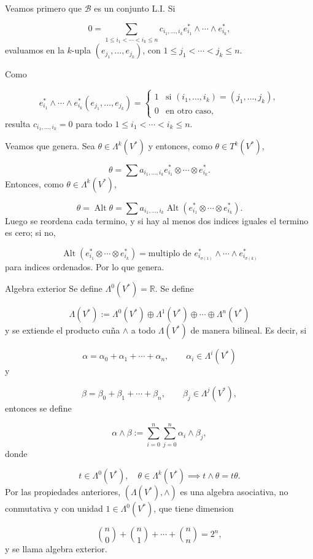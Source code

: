 \begin{bookproof}{}
Veamos primero que $\mathcal B$ es un conjunto L.I. Si

\[
0=\sum_{1\le i_1<\cdots<i_k\le n}c_{i_1,\ldots,i_k}e^*_{i_1}\wedge\cdots\wedge e^*_{i_k},
\]
evaluamos en la $k$-upla $(e_{j_1},\ldots,e_{j_k})$, con $1\le j_1<\cdots<j_k\le n$.

Como

\[
e^*_{i_1}\wedge\cdots\wedge e^*_{i_k}(e_{j_1},\ldots,e_{j_k}) = \begin{cases} 1 & \text{si }(i_1,\ldots,i_k)=(j_1,\ldots,j_k),\\ 0 & \text{en otro caso}, \end{cases}
\]
resulta $c_{i_1,\ldots,i_k}=0$ para todo $1\le i_1<\cdots<i_k\le n$.

Veamos que genera. Sea $\theta\in\Lambda^k(V^*)$ y entonces, como $\theta\in T^k(V^*)$,

\[
\theta=\sum a_{i_1,\ldots,i_k}e^*_{i_1}\otimes\cdots\otimes e^*_{i_k}.
\]
Entonces, como $\theta\in\Lambda^k(V^*)$,

\[
\theta=\operatorname{Alt}\theta= \sum a_{i_1,\ldots,i_k}\operatorname{Alt}(e^*_{i_1}\otimes\cdots\otimes e^*_{i_k}).
\]
Luego se reordena cada termino, y si hay al menos dos indices iguales el termino es cero; si no,

\[
\operatorname{Alt}(e^*_{i_1}\otimes\cdots\otimes e^*_{i_k})=\text{multiplo de }e^*_{i_{\sigma(1)}}\wedge\cdots\wedge e^*_{i_{\sigma(k)}}
\]
para indices ordenados. Por lo que genera.

\bookqed
\end{bookproof}
\begin{bookdefinition}{Algebra exterior}
Se define $\Lambda^0(V^*)=\mathbb R$. Se define

\[
\Lambda(V^*):=\Lambda^0(V^*)\oplus\Lambda^1(V^*)\oplus\cdots\oplus\Lambda^n(V^*)
\]
y se extiende el producto cuña $\wedge$ a todo $\Lambda(V^*)$ de manera bilineal. Es decir, si

\[
\alpha=\alpha_0+\alpha_1+\cdots+\alpha_n,\qquad \alpha_i\in\Lambda^i(V^*)
\]
y

\[
\beta=\beta_0+\beta_1+\cdots+\beta_n,\qquad \beta_j\in\Lambda^j(V^*),
\]
entonces se define

\[
\alpha\wedge\beta:=\sum_{i=0}^n\sum_{j=0}^n\alpha_i\wedge\beta_j,
\]
donde

\[
t\in\Lambda^0(V^*),\quad \theta\in\Lambda^k(V^*)\implies t\wedge\theta=t\theta.
\]
Por las propiedades anteriores, $(\Lambda(V^*),\wedge)$ es una algebra asociativa, no conmutativa y con unidad $1\in\Lambda^0(V^*)$, que tiene dimension

\[
\binom n0+\binom n1+\cdots+\binom nn=2^n,
\]
y se llama algebra exterior.

\end{bookdefinition}
\label{blk:2c0c65}
